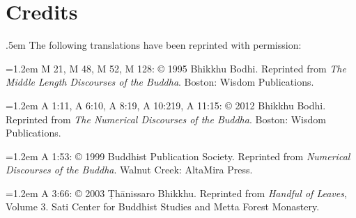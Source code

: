 \chapter{Credits}\label{credits}
{\parindent 0pt\parskip .5em
The following translations have been reprinted with permission:

\vspace{1em}\hangindent=1.2em
M 21, M 48, M 52, M 128: © 1995 Bhikkhu Bodhi. Reprinted from \emph{The
Middle Length Discourses of the Buddha}. Boston: Wisdom Publications.

\hangindent=1.2em
A 1:11, A 6:10, A 8:19, A 10:219, A 11:15: © 2012 Bhikkhu
Bodhi. Reprinted from \emph{The Numerical Discourses of the Buddha}.
Boston: Wisdom Publications.

\hangindent=1.2em A 1:53: © 1999 Buddhist Publication Society. Reprinted
from \emph{Numerical Discourses of the Buddha}. Walnut Creek: AltaMira
Press.

\hangindent=1.2em A 3:66: © 2003 Ṭhānissaro Bhikkhu. Reprinted from
\emph{Handful of Leaves}, Volume 3. Sati Center for Buddhist Studies
and Metta Forest Monastery.

}
